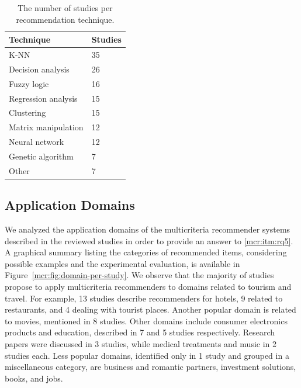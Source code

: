 \begin{table}
\centering
\begin{tabular}{@{}ll@{}}
\toprule
Technique           & Studies \\ \midrule
K-NN                & 35      \\
Decision analysis   & 26      \\
Fuzzy logic         & 16      \\
Regression analysis & 15      \\
Clustering          & 15      \\
Matrix manipulation & 12      \\
Neural network      & 12      \\
Genetic algorithm   & 7       \\
Other               & 7       \\ \bottomrule
\end{tabular}
\caption[Studies per recommendation technique]{The number of studies per recommendation technique.}
\label{mcr:tab:study-per-technique}
\end{table}

\subsection{Application Domains}
\label{mcr:sec:domains}

We analyzed the application domains of the multicriteria recommender systems described in the reviewed studies in order to provide an answer to \ref{mcr:itm:rq5}. A graphical summary listing the categories of recommended items, considering possible examples and the experimental evaluation, is available in Figure~\ref{mcr:fig:domain-per-study}. We observe that the majority of studies propose to apply multicriteria recommenders to domains related to tourism and travel. For example, 13 studies describe recommenders for hotels, 9 related to restaurants, and 4 dealing with tourist places. Another popular domain is related to movies, mentioned in 8 studies. Other domains include consumer electronics products and education, described in 7 and 5 studies respectively. Research papers were discussed in 3 studies, while medical treatments and music in 2 studies each. Less popular domains, identified only in 1 study and grouped in a miscellaneous category, are business and romantic partners, investment solutions, books, and jobs.

